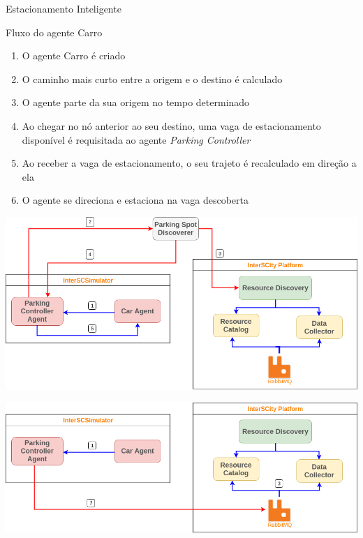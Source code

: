 \documentclass[xcolor={usenames,svgnames,dvipsnames},brazil,english,12pt,aspectratio=149]{beamer}
\begin{document}
\begin{frame}{Estacionamento Inteligente}
    \begin{block}{Fluxo do agente Carro}
        \begin{enumerate}
            \item O agente Carro é criado
            \item O caminho mais curto entre a origem e o destino é calculado
            \item O agente parte da sua origem no tempo determinado
            \item Ao chegar no nó anterior ao seu destino, uma vaga de estacionamento disponível é requisitada ao agente \textit{Parking Controller}
            \item Ao receber a vaga de estacionamento, o seu trajeto é recalculado em direção a ela
            \item O agente se direciona e estaciona na vaga descoberta
        \end{enumerate}
    \end{block}
\end{frame}

\begin{frame}[plain]
    \begin{center}
        \includegraphics[width=\textwidth]{integration_get_data_smart_parking.png}
    \end{center}
\end{frame}

\begin{frame}[plain]
    \begin{center}
        \includegraphics[width=\textwidth]{integration_publish_data_smart_parking.png}
    \end{center}
\end{frame}
\end{document}
